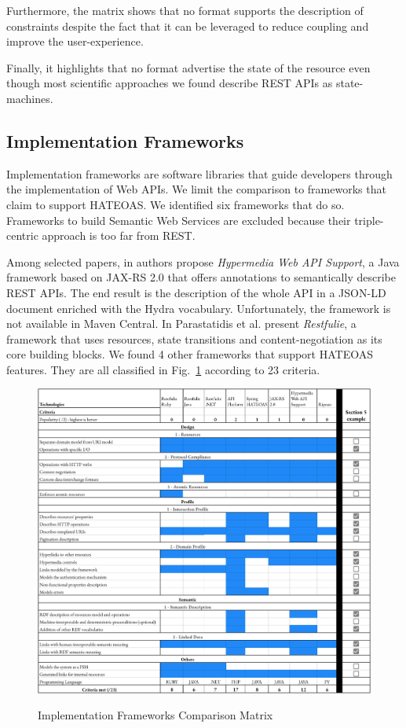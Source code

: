 Furthermore, the matrix shows that no format supports the description of constraints despite the fact that it can be leveraged to reduce coupling and improve the user-experience.

Finally, it highlights that no format advertise the state of the resource even though most scientific approaches we found describe REST APIs as state-machines.

\subsection{Implementation Frameworks}

Implementation frameworks are software libraries that guide developers through the implementation of Web APIs. We limit the comparison to frameworks that claim to support HATEOAS. We identified six frameworks that do so. Frameworks to build Semantic Web Services are excluded because their triple-centric approach is too far from REST.

Among selected papers, in \cite{salvadori2014framework} authors propose \textit{Hypermedia Web API Support}, a Java framework based on JAX-RS 2.0 that offers annotations to semantically describe REST APIs. The end result is the description of the whole API in a JSON-LD document enriched with the Hydra vocabulary. Unfortunately, the framework is not available in Maven Central. In \cite{parastatidis2010role} Parastatidis et al. present \textit{Restfulie}, a framework that uses resources, state transitions and content-negotiation as its core building blocks. We found 4 other frameworks that support HATEOAS features. They are all classified in Fig.~\ref{frameworks-matrix} according to 23 criteria.

\begin{figure}[!ht]
\caption{Implementation Frameworks Comparison Matrix}
\includegraphics[width=1\textwidth]{figures/frameworks.png}
\label{frameworks-matrix}
\end{figure}

